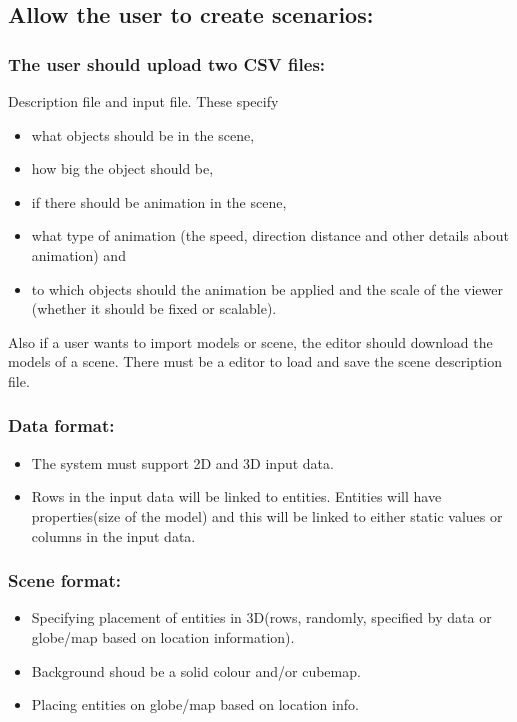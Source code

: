 \documentclass[a4paper,12pt]{article}
\begin{document}
\subsection{Allow the user to create scenarios:}
\subsubsection{The user should upload two CSV files:} Description file and input file. These specify 
\begin{itemize}
	\item what objects should be in the scene, 
	\item how big the object should be, 
	\item if there should be animation in the scene, 
	\item what type of animation (the speed, direction distance and other details about animation) and 
	\item to which objects should the animation be applied and the scale of the viewer (whether it should be fixed or scalable).
\end{itemize} 
Also if a user wants to import models or scene, the editor should download the models of a scene. There must be a editor to load and save the scene description file.

\subsubsection{Data format:} 
\begin{itemize}
	\item The system must support 2D and 3D input data. 
	\item Rows in the input data will be linked to entities. Entities will have properties(size of the model) and this will be linked to either static values or columns in the input data.
\end{itemize}
\subsubsection{Scene format:} 
\begin{itemize}
	\item Specifying placement of entities in 3D(rows, randomly, specified by data or globe/map based on location information).
	\item Background shoud be a solid colour and/or cubemap.
	\item Placing entities on globe/map based on location info. 
\end{itemize}
\end{document}

